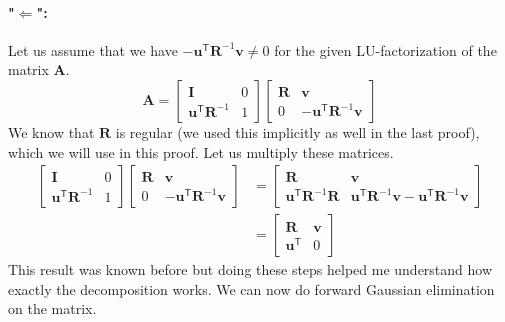 \documentclass{article}
\begin{document}
\paragraph{"$\Longleftarrow$":} Let us assume that we have $- \mathbf{u}^{\mathsf{T}}\mathbf{R}^{-1}\mathbf{v} \neq 0$ for the given LU-factorization of the matrix $\mathbf{A}$.
\begin{equation*}
     \mathbf{A} = \begin{bmatrix}
        \mathbf{I} & 0 \\
        \mathbf{u}^{\mathsf{T}}\mathbf{R}^{-1} & 1
    \end{bmatrix}
    \begin{bmatrix}
        \mathbf{R} & \mathbf{v} \\
        0 &  - \mathbf{u}^{\mathsf{T}}\mathbf{R}^{-1}\mathbf{v}
    \end{bmatrix}
\end{equation*}
We know that $\mathbf{R}$ is regular (we used this implicitly as well in the last proof), which we will use in this proof. Let us multiply these matrices.
\begin{align*}
    \begin{bmatrix}
        \mathbf{I} & 0 \\
        \mathbf{u}^{\mathsf{T}}\mathbf{R}^{-1} & 1
    \end{bmatrix}
    \begin{bmatrix}
        \mathbf{R} & \mathbf{v} \\
        0 &  - \mathbf{u}^{\mathsf{T}}\mathbf{R}^{-1}\mathbf{v}
    \end{bmatrix} &= 
    \begin{bmatrix}
        \mathbf{R} & \mathbf{v} \\
        \mathbf{u}^{\mathsf{T}}\mathbf{R}^{-1}\mathbf{R} &  \mathbf{u}^{\mathsf{T}}\mathbf{R}^{-1}\mathbf{v}- \mathbf{u}^{\mathsf{T}}\mathbf{R}^{-1}\mathbf{v}
    \end{bmatrix} \\[1mm]
    &=
    \begin{bmatrix}
        \mathbf{R} & \mathbf{v} \\
        \mathbf{u}^{\mathsf{T}}&  0
    \end{bmatrix}
\end{align*}
This result was known before but doing these steps helped me understand how exactly the decomposition works. We can now do forward Gaussian elimination on the matrix.
\end{document}
